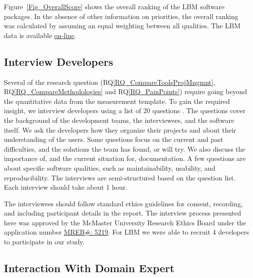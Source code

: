 \documentclass[runningheads]{llncs}
\newcommand{\rqref}[1]{RQ\ref{#1}}
\begin{document}
Figure~\ref{Fig_OverallScore} shows the overall ranking of the LBM software
packages. In the absence of other information on priorities, the overall ranking
was calculated by assuming an equal weighting between all qualities.  The LBM data is available \href{https://github.com/smiths/AIMSS/blob/master/StateOfPractice/DomainMeasurements/LBM-Peter/Completed_LBS_Combined_MeasurementTemplate_EmpiricalMeasures_ADDED_MUSUBI_UPDATED_STATS.xlsx} {on-line}.

\subsection{Interview Developers} \label{SecSurvey}

Several of the research question (\rqref{RQ_CompareToolsProjMngmnt},
\rqref{RQ_CompareMethodologies} and \rqref{RQ_PainPoints}) require going beyond
the quantitative data from the measurement template. To gain the required
insight, we interview developers using a list of 20 questions
\cite{SmithEtAl2021}. The questions cover the background of the development
teams, the interviewees, and the software itself. We ask the developers how they
organize their projects and about their understanding of the users. Some
questions focus on the current and past difficulties, and the solutions the team
has found, or will try. We also discuss the importance of, and the current
situation for, documentation. A few questions are about specific software
qualities, such as maintainability, usability, and reproducibility. The
interviews are semi-structured based on the question list.  Each interview
should take about 1 hour.

The interviewees should follow standard ethics guidelines for consent,
recording, and including participant details in the report. The interview
process presented here was approved by the McMaster University Research Ethics
Board under the application number 
\href{https://github.com/smiths/AIMSS/blob/master/StateOfPractice/MACREM/Application.pdf}
{MREB\#: 5219}.  For LBM we were able to recruit 4 developers to participate in
our study.

\subsection{Interaction With Domain Expert} \label{sec_vet_software_list}
\end{document}
